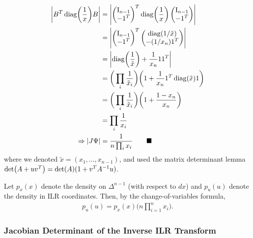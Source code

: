 \begin{align*}
    \AbsDet{B^T \Diag{\frac{1}{x}} B} & = \AbsDet{\begin{pmatrix} \Id_{n-1} \\ -\One^T \end{pmatrix}^T \Diag{\frac{1}{x}} \begin{pmatrix} \Id_{n-1} \\ -\One^T \end{pmatrix}}                        \\
                                      & = \AbsDet{\begin{pmatrix} \Id_{n-1} \\ -\One^T \end{pmatrix}^T \begin{pmatrix} \Diag{1 / \tilde{x}} \\ -(1 / x_{n}) \One^T \end{pmatrix}}                                           \\
                                      & = \AbsDet{\Diag{\frac{1}{\tilde{x}}} + \frac{1}{x_{n}} \One \One^T}                                          \\
                                      & = \bigg( \prod_i \frac{1}{\tilde{x}_i} \bigg) \bigg( 1 + \frac{1}{x_{n}} \One^T \Diag{\tilde{x}} \One \bigg) \\
                                      & = \bigg( \prod_i \frac{1}{\tilde{x}_i} \bigg) \bigg( 1 + \frac{1 - x_{n}}{x_{n}} \bigg)                      \\
                                      & = \prod_i \frac{1}{x_i}                                                                                      \\
    \Rightarrow \AbsDet{J\Psi}        & = \frac{1}{n\prod_i x_i} \tag*{$\blacksquare$}
\end{align*}
where we denoted $\tilde{x}=(x_1,\ldots,x_{n-1})$, and used the matrix determinant lemma $\Det{A + uv^T} = \Det{A} (1 + v^T A^{-1} u)$.

Let $p_x(x)$ denote the density on $\Delta^{n-1}$ (with respect to $dx$) and $p_u(u)$ denote the density in \gls*{ILR} coordinates.
Then, by the change-of-variables formula,
\begin{align}
    \boxed{p_u(u) = p_x(x) \bigg( n \prod_{i=1}^{n} x_i \bigg).}
\end{align}

\subsubsection{Jacobian Determinant of the Inverse \gls*{ILR} Transform}

